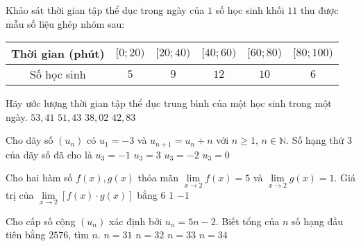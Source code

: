 \begin{ex}%
	Khảo sát thời gian tập thể dục trong ngày của $1$ số học sinh khối $11$ thu được mẫu số liệu ghép nhóm sau:
	\begin{longtable}{|c|c|c|c|c|c|}
		\hline
		Thời gian (phút) & $[0;20)$ & $[20;40)$ & $[40;60)$ & $[60;80)$ & $[80;100)$ \\
		\hline
		Số học sinh      & $5$      & $9$       & $12$      & $10$      & $6$        \\
		\hline
	\end{longtable}
	Hãy ước lượng thời gian tập thể dục trung bình của một học sinh trong một ngày.
	\choice
	{$53{,}41$}
	{\True $51{,}43$}
	{$38{,}02$}
	{$42{,}83$}
\end{ex}

\begin{ex}%
	Cho dãy số $(u_n)$ có $u_1=-3$ và $u_{n+1}=u_n+n$ với $n\ge 1$, $n\in \mathbb{N}$. Số hạng thứ $3$ của dãy số đã cho là
	\choice
	{$u_3=-1$}
	{$u_3=3$}
	{$u_3=-2$}
	{\True $u_3=0$}
\end{ex}

\begin{ex}%
	Cho hai hàm số $f\left(x\right),g\left(x\right)$ thỏa mãn ${\mathop{\lim}\limits_{x\to 2}} f\left(x\right)=5$ và ${\mathop{\lim}\limits_{x\to 2}} g\left(x\right)=1$. Giá trị của ${\mathop{\lim}\limits_{x\to 2}} \left[f\left(x\right)\cdot g\left(x\right)\right]$ bằng
	{$6$}
	{$1$}
	{$-1$}
\end{ex}

\begin{ex}%
	Cho cấp số cộng $\left(u_n\right)$ xác định bởi $u_n=5n-2$. Biết tổng của $n$ số hạng đầu tiên bằng $2576$, tìm $n$.
	\choice
	{$n=31$}
	{\True $n=32$}
	{$n=33$}
	{$n=34$}
\end{ex}


